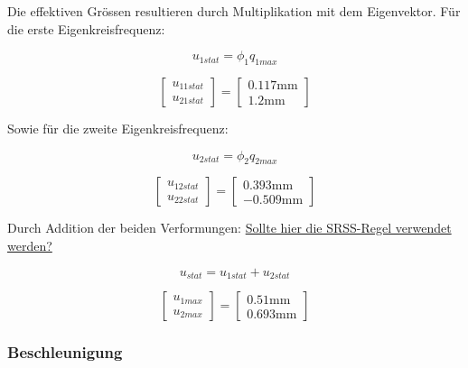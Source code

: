 \documentclass[
  letterpaper,
  DIV=11]{scrreprt}
\begin{document}
Die effektiven Grössen resultieren durch Multiplikation mit dem
Eigenvektor. Für die erste Eigenkreisfrequenz:

\begin{equation}u_{1 stat} = \phi_{1} q_{1 max}\end{equation}

\begin{equation}\left[\begin{matrix}u_{11stat}\\u_{21stat}\end{matrix}\right] = \left[\begin{matrix}0.117 \text{mm}\\1.2 \text{mm}\end{matrix}\right]\end{equation}

Sowie für die zweite Eigenkreisfrequenz:

\begin{equation}u_{2 stat} = \phi_{2} q_{2 max}\end{equation}

\begin{equation}\left[\begin{matrix}u_{12stat}\\u_{22stat}\end{matrix}\right] = \left[\begin{matrix}0.393 \text{mm}\\- 0.509 \text{mm}\end{matrix}\right]\end{equation}

Durch Addition der beiden Verformungen: \ul{Sollte hier die SRSS-Regel
verwendet werden?}

\begin{equation}u_{stat} = u_{1 stat} + u_{2 stat}\end{equation}

\begin{equation}\left[\begin{matrix}u_{1max}\\u_{2max}\end{matrix}\right] = \left[\begin{matrix}0.51 \text{mm}\\0.693 \text{mm}\end{matrix}\right]\end{equation}

\hypertarget{beschleunigung}{%
\subsubsection{Beschleunigung}\label{beschleunigung}}
\end{document}
